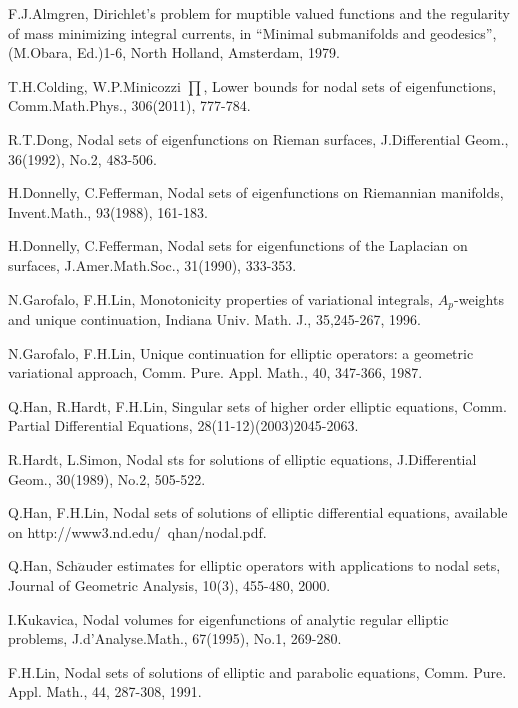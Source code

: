 \documentclass[a4paper, 12pt, onecolumn]{article} \textwidth 148mm
\begin{document}
\begin{thebibliography}{}

 F.J.Almgren, Dirichlet's problem for muptible valued functions and the regularity of mass minimizing integral currents, in ``Minimal submanifolds and geodesics'', (M.Obara, Ed.)1-6, North Holland, Amsterdam, 1979.

 T.H.Colding, W.P.Minicozzi $\prod$, Lower bounds for nodal sets of eigenfunctions, Comm.Math.Phys., 306(2011), 777-784.

 R.T.Dong, Nodal sets of eigenfunctions on Rieman surfaces, J.Differential Geom., 36(1992), No.2, 483-506.

 H.Donnelly, C.Fefferman, Nodal sets of eigenfunctions on Riemannian manifolds, Invent.Math., 93(1988), 161-183.

 H.Donnelly, C.Fefferman, Nodal sets for eigenfunctions of the Laplacian on surfaces, J.Amer.Math.Soc., 31(1990), 333-353.

 N.Garofalo, F.H.Lin, Monotonicity properties of variational integrals, $A_p$-weights and unique continuation, Indiana Univ. Math. J., 35,245-267, 1996.

 N.Garofalo, F.H.Lin, Unique continuation for elliptic operators: a geometric variational approach, Comm. Pure. Appl. Math., 40, 347-366, 1987.

 Q.Han, R.Hardt, F.H.Lin, Singular sets of higher order elliptic equations, Comm. Partial Differential Equations, 28(11-12)(2003)2045-2063.

 R.Hardt, L.Simon, Nodal sts for solutions of elliptic equations, J.Differential Geom., 30(1989), No.2, 505-522.

 Q.Han, F.H.Lin, Nodal sets of solutions of elliptic differential equations, available on http://www3.nd.edu/~qhan/nodal.pdf.

 Q.Han, Sch$\ddot{a}$uder estimates for elliptic operators with applications to nodal sets, Journal of Geometric Analysis, 10(3), 455-480, 2000.

 I.Kukavica, Nodal volumes for eigenfunctions of analytic regular elliptic problems, J.d'Analyse.Math., 67(1995), No.1, 269-280.

 F.H.Lin, Nodal sets of solutions of elliptic and parabolic equations, Comm. Pure. Appl. Math., 44, 287-308, 1991.


\end{thebibliography}
\end{document}
